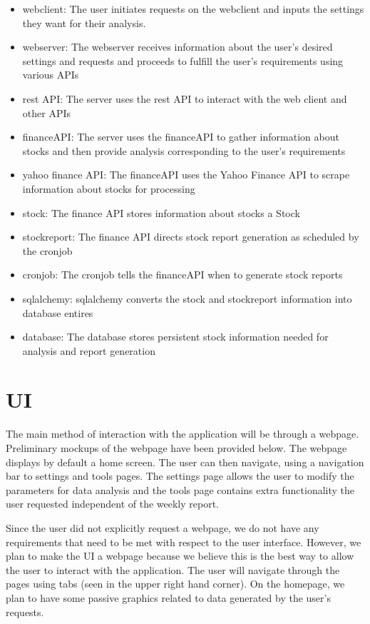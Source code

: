 \documentclass[12pt,a4paper]{article}
\begin{document}
\begin{itemize}
\item webclient: The user initiates requests on the webclient and inputs the settings they want for their analysis. 
\item webserver: The webserver receives information about the user's desired settings and requests and proceeds to fulfill the user's requirements using various APIs
\item rest API: The server uses the rest API to interact with the web client and other APIs
\item financeAPI: The server uses the financeAPI to gather information about stocks and then provide analysis corresponding to the user's requirements
\item yahoo finance API: The financeAPI uses the Yahoo Finance API to scrape information about stocks for processing
\item stock: The finance API stores information about stocks a Stock
\item stockreport: The finance API directs stock report generation as scheduled by the cronjob
\item cronjob: The cronjob tells the financeAPI when to generate stock reports
\item sqlalchemy: sqlalchemy converts the stock and stockreport information into database entires
\item database: The database stores persistent stock information needed for analysis and report generation
\end{itemize}

\section{UI}

The main method of interaction with the application will be through a webpage. Preliminary mockups of the webpage have been provided below. The webpage displays by default a home screen. The user can then navigate, using a navigation bar to settings and tools pages. The settings page allows the user to modify the parameters for data analysis and the tools page contains extra functionality the user requested independent of the weekly report.
\vspace{0.1cm}

\indent Since the user did not explicitly request a webpage, we do not have any requirements that need to be met with respect to the user interface. However, we plan to make the UI a webpage because we believe this is the best way to allow the user to interact with the application. The user will navigate through the pages using tabs (seen in the upper right hand corner). On the homepage, we plan to have some passive graphics related to data generated by the user's requests. 
\end{document}
